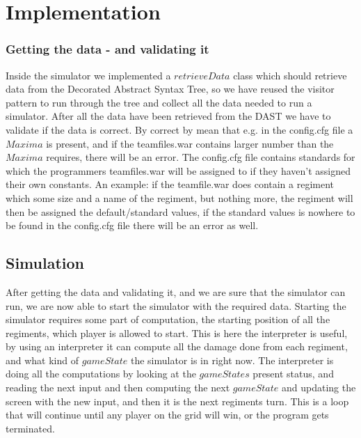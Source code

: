 \section{Implementation}




\subsubsection{Getting the data - and validating it}
Inside the simulator we implemented a $retrieveData$ class which should retrieve data from the Decorated Abstract Syntax Tree, so we have reused the visitor pattern to run through the tree and collect all the data needed to run a simulator. After all the data have been retrieved from the DAST we have to validate if the data is correct. By correct by mean that e.g. in the config.cfg file a $Maxima$ is present, and if the teamfiles.war contains larger number than the $Maxima$ requires, there will be an error. The config.cfg file contains standards for which the programmers teamfiles.war will be assigned to if they haven't assigned their own constants. An example: if the teamfile.war does contain a regiment which some size and a name of the regiment, but nothing more, the regiment will then be assigned the default/standard values, if the standard values is nowhere to be found in the config.cfg file there will be an error as well.


\subsection{Simulation}

After getting the data and validating it, and we are sure that the simulator can run, we are now able to start the simulator with the required data. 
Starting the simulator requires some part of computation, the starting position of all the regiments, which player is allowed to start. This is here the interpreter is useful, by using an interpreter it can compute all the damage done from each regiment, and what kind of $gameState$ the simulator is in right now. The interpreter is doing all the computations by looking at the $gameStates$ present status, and reading the next input and then computing the next $gameState$ and updating the screen with the new input, and then it is the next regiments turn. This is a loop that will continue until any player on the grid will win, or the program gets terminated.







